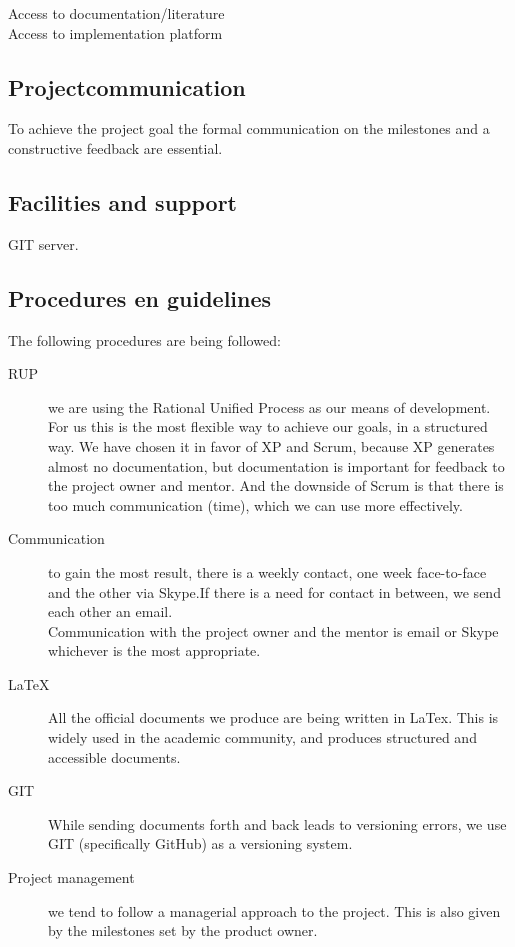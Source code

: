 \documentclass{article}
\begin{document}
Access to documentation/literature\\
Access to implementation platform

\subsection{Projectcommunication}

To achieve the project goal the formal communication on the milestones and a constructive feedback are essential.

\subsection{Facilities and support}

GIT server.

\subsection{Procedures en guidelines}
The following procedures are being followed:
\begin{description}
  \item[RUP] we are using the Rational Unified Process as our means of development. For us this is the most flexible way to achieve our goals, in a structured way. We have chosen it in favor of XP and Scrum, because XP generates almost no documentation, but documentation is important for feedback to the project owner and mentor. And the downside of Scrum is that there is too much communication (time), which we can use more effectively.
  \item[Communication] to gain the most result, there is a weekly contact, one week face-to-face and the other via Skype.If there is a need for contact in between, we send each other an email.\\
Communication with the project owner and the mentor is email or Skype whichever is the most appropriate.
  \item[LaTeX] All the official documents we produce are being written in LaTex. This is widely used in the academic community, and produces structured and accessible documents.
  \item[GIT] While sending documents forth and back leads to versioning errors, we use GIT (specifically GitHub) as a versioning system.
  \item[Project management] we tend to follow a managerial approach to the project. This is also given by the milestones set by the product owner.
\end{description}
\end{document}
